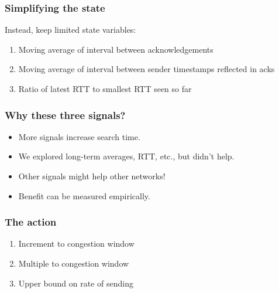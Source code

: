 \documentclass[svgnames]{beamer}
\begin{document}
\begin{frame}
\frametitle{Simplifying the state}

Instead, keep limited state variables:

\begin{enumerate}

\item Moving average of interval between acknowledgements

\item Moving average of interval between sender timestamps reflected in acks

\item Ratio of latest RTT to smallest RTT seen so far

\end{enumerate}

\end{frame}

\begin{frame}
\frametitle{Why these three signals?}

\begin{itemize}

\item More signals increase search time.

\item We explored long-term averages, RTT, etc., but didn't help.

\item Other signals might help other networks!

\item Benefit can be measured empirically.

\end{itemize}

\end{frame}

\begin{frame}
\frametitle{The action}

\begin{enumerate}

\item Increment to congestion window

\item Multiple to congestion window

\item Upper bound on rate of sending

\end{enumerate}

\end{frame}
\end{document}
